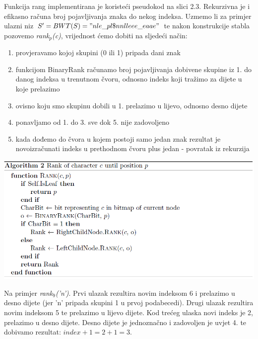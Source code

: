 \documentclass[times, utf8, seminar, numeric]{fer}
\begin{document}
\par Funkcija rang implementirana je koristeći pseudokod na slici 2.3. Rekurzivna je i efikasno računa broj pojavljivanja znaka do nekog indeksa. Uzmemo li za primjer ulazni niz $S' = BWT(S) = "nle\_pl\$nnlleee\_eaae"$ te nakon konstrukcije stabla pozovemo \textit{rank$_p$(c)}, vrijednost ćemo dobiti na sljedeći način:

\begin{center}
	\begin{enumerate}
		\setlength\itemsep{-0.8em}
		\item {provjeravamo kojoj skupini (0 ili 1) pripada dani znak}
		\item {funkcijom BinaryRank računamo broj pojavljivanja dobivene skupine iz 1. do danog indeksa u trenutnom čvoru, odnosno indeks koji tražimo za dijete u koje prelazimo}
		\item {ovisno koju smo skupinu dobili u 1. prelazimo u lijevo, odnosno desno dijete}
		\item {ponavljamo od 1. do 3. sve dok 5. nije zadovoljeno}
		\item {kada dođemo do čvora u kojem postoji samo jedan znak rezultat je novoizračunati indeks u prethodnom čvoru plus jedan - povratak iz rekurzija}
		
	\end{enumerate} 
\end{center}


\begin{center}
	\includegraphics[scale=0.5]{slike/rank.png}
\end{center}

Na primjer \textit{rank$_9$('n')}. Prvi ulazak rezultira novim indeksom 6 i prelazimo u desno dijete (jer 'n' pripada skupini 1 u prvoj podabecedi). Drugi ulazak rezultira novim indeksom 5 te prelazimo u lijevo dijete. Kod trećeg ulaska novi indeks je 2, prelazimo u desno dijete. Desno dijete je jednoznačno i zadovoljen je uvjet 4. te dobivamo rezultat: $index + 1 = 2 + 1 = 3$.
\end{document}
